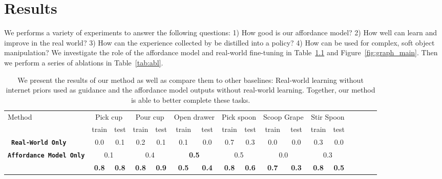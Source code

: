 \chapter{Results}
\label{sec:results}

We performs a variety of experiments to answer the following questions:  1) How good is our affordance model? 2) How well can \ours learn and improve in the real world? 3) How can the experience collected by \ours be distilled into a policy? 4) How can \ours be used for complex, soft object manipulation? We investigate the role of the affordance model and real-world fine-tuning in Table~\ref{tab:main} and Figure~\ref{fig:graph_main}. Then we perform a series of ablations in Table~\ref{tab:abl}.

\begin{table}[t]
    \centering
    \resizebox{\linewidth}{!}
    {%
        \begin{tabular}{lcccccccccccccccc}
        \toprule
        Method & \multicolumn{2}{c}{Pick cup} & \multicolumn{2}{c}{Pour cup} & \multicolumn{2}{c}{Open drawer} & \multicolumn{2}{c}{Pick spoon} & \multicolumn{2}{c}{Scoop Grape} & \multicolumn{2}{c}{Stir Spoon} & \\ 
        & train & test & train & test & train & test & train & test & train & test & train & test \\
        \midrule
        \
        \textbf{\texttt{Real-World Only}} & 0.0 & 0.1 & 0.2 & 0.1 & 0.1 & 0.0 & 0.7 & 0.3 & 0.0 & 0.0 & 0.3 & 0.0 \\ 
        \textbf{\texttt{Affordance Model Only}} & \multicolumn{2}{c}{0.1} & \multicolumn{2}{c}{0.4} & \multicolumn{2}{c}{\textbf{0.5}} & \multicolumn{2}{c}{0.5} & \multicolumn{2}{c}{0.0} & \multicolumn{2}{c}{0.3}\\ 
        
        \midrule
        \textbf{\texttt{\ours}} & \textbf{0.8} & \textbf{0.8} & \textbf{0.8} & \textbf{0.9} & \textbf{0.5} & \textbf{0.4} & \textbf{0.8} & \textbf{0.6} & \textbf{0.7} & \textbf{0.3} & \textbf{0.8} & \textbf{0.5}\\
        \bottomrule
        \end{tabular}
    }
    \vspace{0.05in}
    \caption{We present the results of our method as well as compare them to other baselines: Real-world learning without internet priors used as guidance and the affordance model outputs without real-world learning.  Together, our method is able to better complete these tasks.}
    \label{tab:main}
\end{table}



